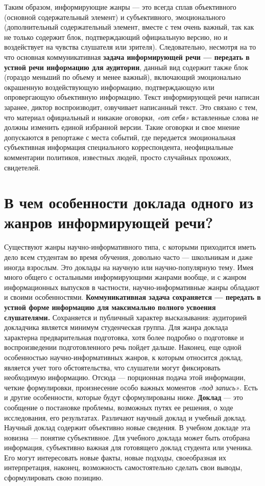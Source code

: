 {{Таким образом, информирующие жанры — это всегда сплав объективного (основной содержательный элемент) и субъективного, эмоционального (дополнительный содержательный элемент, вместе с тем очень важный, так как не только содержит блок, подтверждающий официальную версию, но и воздействует на чувства слушателя или зрителя). Следовательно, несмотря на то что основная коммуникативная \textbf{задача информирующей речи — передать в устной речи информацию для аудитории}, данный вид содержит также блок (гораздо меньший по объему и менее важный), включающий эмоционально окрашенную воздействующую информацию, подтверждающую или опровергающую объективную информацию. Текст информирующей речи написан заранее, диктор воспроизводит, озвучивает написанный текст. Это связано с тем, что материал официальный и никакие оговорки, \textit{«от себя»} вставленные слова не должны изменить единой избранной версии. Такие оговорки и свое мнение допускаются в репортаже с места событий, где передается эмоциональная субъективная информация специального корреспондента, неофициальные комментарии политиков, известных людей, просто случайных прохожих, свидетелей. 
\chapter{\textbf{В чем особенности доклада одного из жанров информирующей речи?}}
Существуют жанры научно-информативного типа, с которыми приходится иметь дело всем студентам во время обучения, довольно часто — школьникам и даже иногда взрослым. Это доклады на научную или научно-популярную тему. Имея много общего с остальными информирующими жанрами вообще, и с жанром информационных выпусков в частности, научно-информативные жанры обладают и своими особенностями. \textbf{Коммуникативная задача сохраняется — передать в устной форме информацию для максимально полного усвоения слушателями.} Сохраняется и публичный характер высказывания: аудиторией докладчика является минимум студенческая группа. Для жанра доклада характерна предварительная подготовка, хотя более подробно о подготовке и воспроизведении подготовленного речь пойдет дальше. Наконец, еще одной особенностью научно-информативных жанров, к которым относится доклад, является учет того обстоятельства, что слушатели могут фиксировать необходимую информацию. Отсюда — порционная подача этой информации, четкие формулировки, произнесение особо важных моментов \textit{«под запись»}. Есть и другие особенности, которые будут сформулированы ниже.
\textbf{Доклад }— это сообщение о постановке проблемы, возможных путях ее решения, о ходе исследования, его результатах. Различают научный доклад и учебный доклад. Научный доклад содержит объективно новые сведения. В учебном докладе эта новизна — понятие субъективное. Для учебного доклада может быть отобрана информация, субъективно важная для готовящего доклад студента или ученика. Его могут интересовать новые факты, новые подходы, своеобразная их интерпретация, наконец, возможность самостоятельно сделать свои выводы, сформулировать свою позицию.
}}
